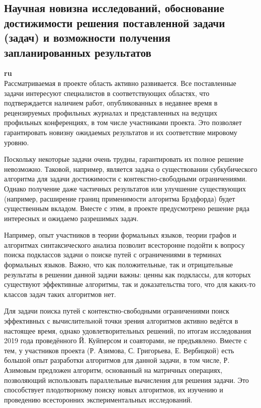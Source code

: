 \documentclass[12pt]{article}  %
\theoremstyle{remark}
\begin{document}
\subsection{Научная новизна исследований, обоснование достижимости решения поставленной задачи (задач) и возможности получения запланированных результатов}

\textbf{ru}\\
%
Рассматриваемая в проекте область активно развивается. Все поставленные задачи интересуют специалистов в соответствующих областях, что подтверждается наличием работ, опубликованных в недавнее время в рецензируемых профильных журналах и представленных на ведущих профильных конференциях, в том числе участниками проекта. Это позволяет гарантировать новизну ожидаемых результатов и их соответствие мировому уровню.

Поскольку некоторые задачи очень трудны, гарантировать их полное решение невозможно. Таковой, например, является задача о существовании субкубического алгоритма для задачи достижимости с контекстно-свободными ограничениями. Однако получение даже частичных результатов или улучшение существующих (например, расширение границ применимости алгоритма Брэдфорда) будет существенным вкладом. Вместе с этим, в проекте предусмотрено решение ряда интересных и ожидаемо разрешимых задач.

Например, опыт участников в теории формальных языков, теории графов и алгоритмах синтаксического анализа позволит всесторонне подойти к вопросу поиска подклассов задачи о поиске путей с ограничениями в терминах формальных языков. Важно, что как положительные, так и отрицательные результаты в решении данной задачи важны: ценны как подклассы, для которых существуют эффективные алгоритмы, так и доказательства того, что для каких-то классов задач таких алгоритмов нет.

Для задачи поиска путей с контекстно-свободными ограничениями поиск эффективных с вычислительной точки зрения алгоритмов активно ведётся в настоящее время, однако удовлетворительных решений, по итогам исследования 2019 года проведённого Й. Куйперсом и соавторами, не предъявлено.
Вместе с тем, у участников проекта (Р. Азимова, С. Григорьева, Е. Вербицкой) есть большой опыт разработки алгоритмов для данной задачи, в том числе, Р. Азимовым предложен алгоритм, основанный на матричных операциях, позволяющий использовать параллельные вычисления для решения задачи. Это способствует плодотворному поиску новых алгоритмов, их изучению и проведению всесторонних экспериментальных исследований.
\end{document}

